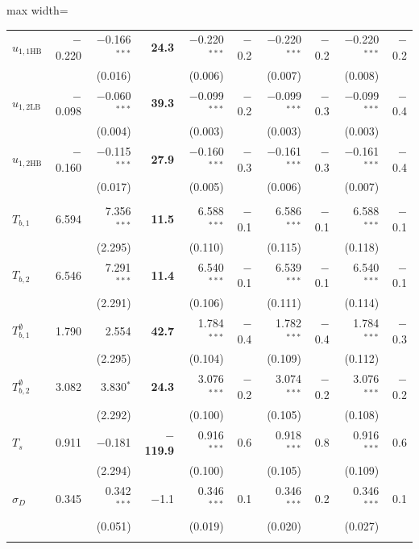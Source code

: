 \begin{table}[htbp]
\begin{adjustbox}{max width=\textwidth}
\begin{tabular}{l r rr rr rr rr}
$u_{1,1\text{HB}}$ & $-$0.220 & $-$0.166$^{***}$ & \textbf{24.3} & $-$0.220$^{***}$ & $-$0.2 & $-$0.220$^{***}$ & $-$0.2 & $-$0.220$^{***}$ & $-$0.2\\
 &  & (0.016) &  & (0.006) &  & (0.007) &  & (0.008) & \\[1pt]
$u_{1,2\text{LB}}$ & $-$0.098 & $-$0.060$^{***}$ & \textbf{39.3} & $-$0.099$^{***}$ & $-$0.2 & $-$0.099$^{***}$ & $-$0.3 & $-$0.099$^{***}$ & $-$0.4\\
 &  & (0.004) &  & (0.003) &  & (0.003) &  & (0.003) & \\[1pt]
$u_{1,2\text{HB}}$ & $-$0.160 & $-$0.115$^{***}$ & \textbf{27.9} & $-$0.160$^{***}$ & $-$0.3 & $-$0.161$^{***}$ & $-$0.3 & $-$0.161$^{***}$ & $-$0.4\\
 &  & (0.017) &  & (0.005) &  & (0.006) &  & (0.007) & \\[1pt]
\addlinespace
\multicolumn{10}{l}{\textit{Costos de transacción}}\\
$T_{b,1}$ & 6.594 & 7.356$^{***}$ & \textbf{11.5} & 6.588$^{***}$ & $-$0.1 & 6.586$^{***}$ & $-$0.1 & 6.588$^{***}$ & $-$0.1\\
 &  & (2.295) &  & (0.110) &  & (0.115) &  & (0.118) & \\[1pt]
$T_{b,2}$ & 6.546 & 7.291$^{***}$ & \textbf{11.4} & 6.540$^{***}$ & $-$0.1 & 6.539$^{***}$ & $-$0.1 & 6.540$^{***}$ & $-$0.1\\
 &  & (2.291) &  & (0.106) &  & (0.111) &  & (0.114) & \\[1pt]
$T^{\emptyset}_{b,1}$ & 1.790 & 2.554 & \textbf{42.7} & 1.784$^{***}$ & $-$0.4 & 1.782$^{***}$ & $-$0.4 & 1.784$^{***}$ & $-$0.3\\
 &  & (2.295) &  & (0.104) &  & (0.109) &  & (0.112) & \\[1pt]
$T^{\emptyset}_{b,2}$ & 3.082 & 3.830$^{*}$ & \textbf{24.3} & 3.076$^{***}$ & $-$0.2 & 3.074$^{***}$ & $-$0.2 & 3.076$^{***}$ & $-$0.2\\
 &  & (2.292) &  & (0.100) &  & (0.105) &  & (0.108) & \\[1pt]
$T_s$ & 0.911 & $-$0.181 & \textbf{$-$119.9} & 0.916$^{***}$ & 0.6 & 0.918$^{***}$ & 0.8 & 0.916$^{***}$ & 0.6\\
 &  & (2.294) &  & (0.100) &  & (0.105) &  & (0.109) & \\[1pt]
$\sigma_D$ & 0.345 & 0.342$^{***}$ & $-$1.1 & 0.346$^{***}$ & 0.1 & 0.346$^{***}$ & 0.2 & 0.346$^{***}$ & 0.1\\
 &  & (0.051) &  & (0.019) &  & (0.020) &  & (0.027) & \\[1pt]
\addlinespace

\end{tabular}
\end{adjustbox}
\end{table}
